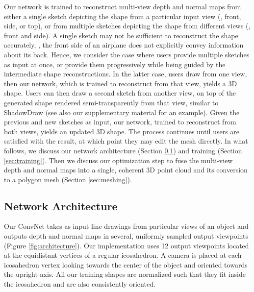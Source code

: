 \documentclass[10pt, conference, compsocconf]{IEEEtran}
\begin{document}
Our network is trained to reconstruct multi-view depth and normal maps from either a single sketch depicting the shape from a particular input view (\eg, front, side, or top), or from multiple sketches depicting the shape from different views (\eg, front and side). A single sketch may not be sufficient to reconstruct the shape accurately, \eg, the front side of an airplane does not explicitly convey information about its back.
Hence, we consider the case where users  provide multiple sketches as input at once, or provide them progressively while being guided by the intermediate shape reconstructions. 
In the latter case,
users draw from one view, then our network, which is trained to reconstruct from that view, yields a 3D shape. Users can then draw a second sketch from another view, on top of the generated shape rendered semi-transparently from that view, similar to ShadowDraw \cite{Lee:2011:SRU} (see also our supplementary material for an example). Given the previous and new sketches as input, our network, trained to reconstruct from both views, yields an updated 3D shape. The process continues until users are satisfied with the result, at which point they may edit the mesh directly. In what follows, we discuss our network architecture (Section \ref{sec:architecture}) and training (Section \ref{sec:training}). Then we discuss our optimization step to fuse the multi-view depth and normal maps into a single, coherent 3D point cloud and  its conversion to a polygon mesh (Section \ref{sec:meshing}).


\vspace{-2mm}
\subsection{Network Architecture}
\label{sec:architecture}
\vspace{-3mm}
Our ConvNet takes as input line drawings from particular  views of an object and outputs depth and normal maps in several, uniformly sampled output viewpoints (Figure \ref{fig:architecture}). Our implementation uses 12 output viewpoints located at the equidistant vertices of a regular icosahedron.
A camera is placed at each icosahedron vertex looking towards the center of the object and oriented towards the upright axis.  All our training shapes are normalized such that they fit inside the icosahedron and are also consistently oriented.
\end{document}
